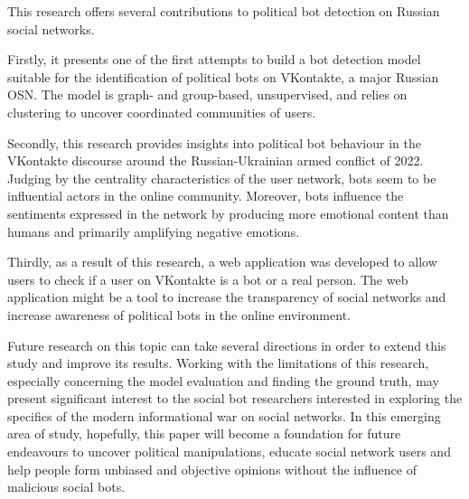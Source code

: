 This research offers several contributions to political bot detection on Russian social networks. 

Firstly, it presents one of the first attempts to build a bot detection model suitable for the identification of political bots on VKontakte, a major Russian OSN. The model is graph- and group-based, unsupervised, and relies on clustering to uncover coordinated communities of users. 

Secondly, this research provides insights into political bot behaviour in the VKontakte discourse around the Russian-Ukrainian armed conflict of 2022. Judging by the centrality characteristics of the user network, bots seem to be influential actors in the online community. Moreover, bots influence the sentiments expressed in the network by producing more emotional content than humans and primarily amplifying negative emotions.

Thirdly, as a result of this research, a web application was developed to allow users to check if a user on VKontakte is a bot or a real person. The web application might be a tool to increase the transparency of social networks and increase awareness of political bots in the online environment.

Future research on this topic can take several directions in order to extend this study and improve its results. Working with the limitations of this research, especially concerning the model evaluation and finding the ground truth, may present significant interest to the social bot researchers interested in exploring the specifics of the modern informational war on social networks. In this emerging area of study, hopefully, this paper will become a foundation for future endeavours to uncover political manipulations, educate social network users and help people form unbiased and objective opinions without the influence of malicious social bots.
